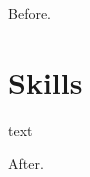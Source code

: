 \documentclass{article}
\begin{document}
Before.

\parbox{\textwidth}{\section*{Skills} text}

After.
\end{document}
